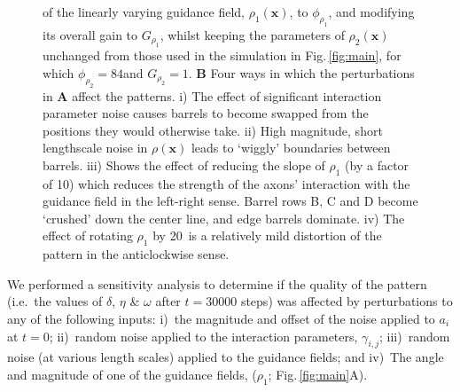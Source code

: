 \documentclass[9pt,lineno]{elife}
\newcommand{\sensitivity}[1]{\textcolor{revgblack}{#1}}
\newcommand{\mb}[1]{\mathbf{#1}}
\begin{document}
\begin{figure}
\begin{fullwidth}
{{        of the linearly varying guidance field, $\rho_1(\mb{x})$, to $\phi_{\rho_1}$,
        and modifying its overall gain to $G_{\rho_1}$, whilst keeping the
        parameters of $\rho_2(\mb{x})$
        unchanged from those used in the simulation in
        Fig.\,\ref{fig:main}, for which
        $\phi_{\rho_2}=84$\textdegree and $G_{\rho_2}=1$.
        \textbf{B} Four ways in which the perturbations in \textbf{A} affect
        the patterns. i) The effect of significant interaction parameter noise
        causes barrels to become swapped from the positions they would
        otherwise take. ii) High magnitude, short lengthscale noise in
        $\rho(\mb{x})$ leads to `wiggly' boundaries between barrels. iii)
        Shows the effect of reducing the slope of $\rho_1$ (by a factor of 10)
        which reduces the strength of the axons' interaction with the guidance
        field in the left-right sense. Barrel rows B, C and D become `crushed'
        down the center line, and edge barrels dominate. iv) The effect of
        rotating $\rho_1$ by 20\textdegree~is a relatively mild distortion of
        the pattern in the anticlockwise sense.
      }
    }
    \label{fig:sens}
  \end{fullwidth}
\end{figure}

\sensitivity{We performed a sensitivity analysis to determine if the quality
  of the pattern (i.e.~the values of $\delta$, $\eta$ \& $\omega$ after
  $t=30000$ steps) was affected by perturbations to any of the following
  inputs:
%
  i)~the magnitude and offset of the noise applied to $a_i$ at $t=0$;
%
  ii)~random noise applied to the interaction parameters, $\gamma_{i,j}$;
%
  iii)~random noise (at various length scales) applied to the guidance fields;
%
  and
%
  iv)~The angle and magnitude of one of the guidance fields, ($\rho_1$;
  Fig.\,\ref{fig:main}A).
}
\end{document}
